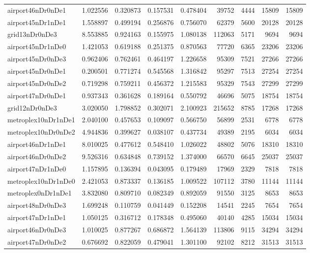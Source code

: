 \begin{longtable}{|l|r|r|r|r|r|r|r|r|}
airport46nDr0nDe1 & 1.022556 & 0.320873 & 0.157531 & 0.478404 & 39752 & 4444 & 15809 & 15809 \\
airport45nDr1nDe1 & 1.558897 & 0.499194 & 0.256876 & 0.756070 & 62379 & 5600 & 20128 & 20128 \\
grid13nDr0nDe3 & 8.553885 & 0.924163 & 0.155975 & 1.080138 & 112063 & 5171 & 9694 & 9694 \\
airport45nDr1nDe0 & 1.421053 & 0.619188 & 0.251375 & 0.870563 & 77720 & 6365 & 23206 & 23206 \\
airport45nDr0nDe3 & 0.962406 & 0.762461 & 0.464197 & 1.226658 & 95309 & 7521 & 27266 & 27266 \\
airport45nDr0nDe1 & 0.200501 & 0.771274 & 0.545568 & 1.316842 & 95297 & 7513 & 27254 & 27254 \\
airport45nDr0nDe2 & 0.719298 & 0.759211 & 0.456372 & 1.215583 & 95329 & 7543 & 27299 & 27299 \\
airport47nDr0nDe1 & 0.937343 & 0.361628 & 0.189164 & 0.550792 & 46696 & 5075 & 18754 & 18754 \\
grid12nDr0nDe3 & 3.020050 & 1.798852 & 0.302071 & 2.100923 & 215652 & 8785 & 17268 & 17268 \\
metroplex10nDr1nDe1 & 2.040100 & 0.457653 & 0.109097 & 0.566750 & 56899 & 2531 & 6778 & 6778 \\
metroplex10nDr0nDe2 & 4.944836 & 0.399627 & 0.038107 & 0.437734 & 49389 & 2195 & 6034 & 6034 \\
airport46nDr1nDe1 & 8.010025 & 0.477612 & 0.548410 & 1.026022 & 48802 & 5076 & 18310 & 18310 \\
airport46nDr0nDe2 & 9.526316 & 0.634848 & 0.739152 & 1.374000 & 66570 & 6645 & 25037 & 25037 \\
airport47nDr1nDe0 & 1.157895 & 0.136394 & 0.043095 & 0.179489 & 17969 & 2329 & 7818 & 7818 \\
metroplex10nDr1nDe0 & 2.421053 & 0.873337 & 0.136185 & 1.009522 & 107112 & 3780 & 11144 & 11144 \\
metroplex0nDr1nDe1 & 3.832080 & 0.809710 & 0.082349 & 0.892059 & 91550 & 3125 & 8653 & 8653 \\
airport48nDr0nDe3 & 1.699248 & 0.110759 & 0.041449 & 0.152208 & 14541 & 2245 & 7654 & 7654 \\
airport47nDr1nDe1 & 1.050125 & 0.316712 & 0.178348 & 0.495060 & 40140 & 4285 & 15034 & 15034 \\
airport46nDr0nDe3 & 1.010025 & 0.877267 & 0.686872 & 1.564139 & 113806 & 9115 & 34294 & 34294 \\
airport47nDr0nDe2 & 0.676692 & 0.822059 & 0.479041 & 1.301100 & 92102 & 8212 & 31513 & 31513 \\

\end{longtable}
